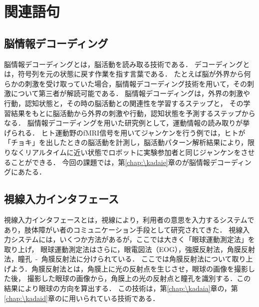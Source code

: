 \chapter{関連語句}
\section{脳情報デコーディング}
脳情報デコーディングとは，脳活動を読み取る技術である．
デコーディングとは，符号列を元の状態に戻す作業を指す言葉である．
たとえば脳が外界から何らかの刺激を受け取っていた場合，脳情報デコーディング技術を用いて，その刺激について第三者が解読可能である．
脳情報デコーディングは，外界の刺激や行動，認知状態と，その時の脳活動との関連性を学習するステップと，
その学習結果をもとに脳活動から外界の刺激や行動，認知状態を予測するステップからなる．
脳情報デコーディングを用いた研究例として，運動情報の読み取りが挙げられる．
ヒト運動野のfMRI信号を用いてジャンケンを行う例では，ヒトが「チョキ」を出したときの脳活動を計測し，脳活動パターン解析結果により，限りなくリアルタイムに近い状態でロボットに実験参加者と同じジャンケンをさせることができる．
今回の課題では，第\ref{chap:\kadaie}章の\kadaie が脳情報デコーディングにあたる．\\
\hfill\cite{脳情報デコーディング技術とその応用}
\section{視線入力インタフェース}
視線入力インタフェースとは，視線により，利用者の意思を入力するシステムであり，肢体障がい者のコミュニケーション手段として研究されてきた．
視線入力システムには，いくつか方法があるが，ここでは大きく「眼球運動測定法」を取り上げ，
眼球運動測定法はさらに，眼電図法（EOG），強膜反射法，角膜反射法，瞳孔\ -\ 角膜反射法に分けられている．
ここでは角膜反射法について取り上げよう．角膜反射法とは，角膜上に光の反射点を生じさせ，眼球の画像を撮影した後，
撮影した眼球の画像から，角膜上の光の反射点と瞳孔を識別する．この結果により眼球の方向を算出する．
この技術は，第\ref{chap:\kadaia}章の\elt ，第\ref{chap:\kadaid}章の\tobi に用いられている技術である．\\
\hfill\cite{weko_847_1}

